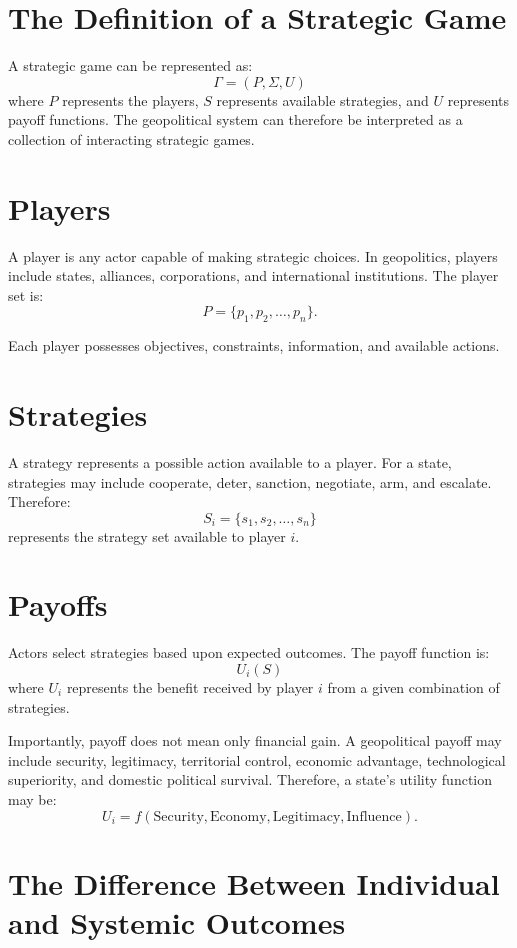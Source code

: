 \documentclass[11pt,openany]{book}
\theoremstyle{plain}
\theoremstyle{definition}
\begin{document}
\section*{The Definition of a Strategic Game}

A strategic game can be represented as:
\[
\Gamma=(P,\Sigma,U)
\]
where \(P\) represents the players, \(S\) represents available strategies, and \(U\) represents payoff functions. The geopolitical system can therefore be interpreted as a collection of interacting strategic games.

\section*{Players}

A player is any actor capable of making strategic choices. In geopolitics, players include states, alliances, corporations, and international institutions. The player set is:
\[
P = \{p_1, p_2, \ldots, p_n\}.
\]

Each player possesses objectives, constraints, information, and available actions.

\section*{Strategies}

A strategy represents a possible action available to a player. For a state, strategies may include cooperate, deter, sanction, negotiate, arm, and escalate. Therefore:
\[
S_i = \{s_1, s_2, \ldots, s_n\}
\]
represents the strategy set available to player \(i\).

\section*{Payoffs}

Actors select strategies based upon expected outcomes. The payoff function is:
\[
U_i(S)
\]
where \(U_i\) represents the benefit received by player \(i\) from a given combination of strategies.

Importantly, payoff does not mean only financial gain. A geopolitical payoff may include security, legitimacy, territorial control, economic advantage, technological superiority, and domestic political survival. Therefore, a state's utility function may be:
\[
U_i = f(\text{Security}, \text{Economy}, \text{Legitimacy}, \text{Influence}).
\]

\section*{The Difference Between Individual and Systemic Outcomes}
\end{document}
